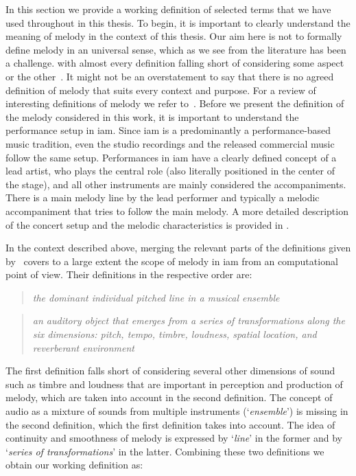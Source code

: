 In this section we provide a working definition of selected terms that we have used throughout in this thesis. To begin, it is important to clearly understand the meaning of melody in the context of this thesis. Our aim here is not to formally define melody in an universal sense, which as we see from the literature has been a challenge. with almost every definition falling short of considering some aspect or the other~\citep{gomez2003melody,salamon:phd:13}. It might not be an overstatement to say that there is no agreed definition of melody that suits every context and purpose. For a review of interesting definitions of melody we refer to~\cite{gomez2003melody,salamon:phd:13}. Before we present the definition of the melody considered in this work, it is important to understand the performance setup in \gls{iam}. Since \gls{iam} is a predominantly a performance-based music tradition, even the studio recordings and the released commercial music follow the same setup. Performances in \gls{iam} have a clearly defined concept of a lead artist, who plays the central role (also literally positioned in the center of the stage), and all other instruments are mainly considered the accompaniments. There is a main melody line by the lead performer and typically a melodic accompaniment that tries to follow the main melody. A more detailed description of the concert setup and the melodic characteristics is provided in .

In the context described above, merging the relevant parts of the definitions given by~\cite{paiva2006melody,levitin2002memory} covers to a large extent the scope of melody in \gls{iam} from an computational point of view. Their definitions in the respective order are:

\blockquote[\cite{paiva2006melody}]{\textit{the dominant individual pitched line in a musical ensemble}}

\blockquote[\cite{levitin2002memory}]{\textit{an auditory object that emerges from a series of transformations along the six dimensions: pitch, tempo, timbre, loudness, spatial location, and reverberant environment}}

The first definition falls short of considering several other dimensions of sound such as timbre and loudness that are important in perception and production of melody, which are taken into account in the second definition. The concept of audio as a mixture of sounds from multiple instruments (`\textit{ensemble}') is missing in the second definition, which the first definition takes into account. The idea of continuity and smoothness of melody is expressed by `\textit{line}' in the former and by `\textit{series of transformations}' in the latter. Combining these two definitions we obtain our working definition as: 

